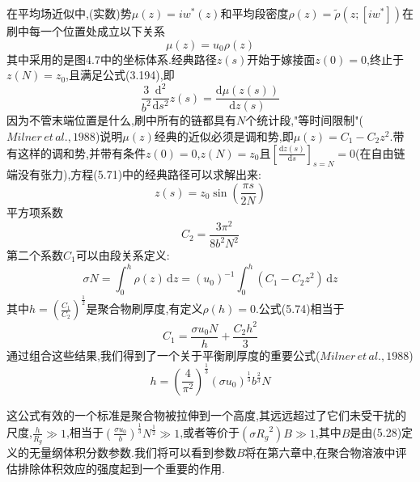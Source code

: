在平均场近似中,(实数)势$\mu(z) = iw^*(z)$和平均段密度$\rho(z) = \tilde{\rho}(z;[iw^*])$在刷中每一个位置处成立以下关系
\begin{equation}
\mu(z) = u_0\rho(z)
\end{equation}
其中采用的是图4.7中的坐标体系.经典路径$z(s)$开始于嫁接面$z(0)=0$,终止于$z(N)=z_0$,且满足公式(3.194),即
\begin{equation}
\frac{3}{b^2}\frac{\mathrm{d}^2}{\mathrm{d} s^2}z(s) = \frac{\mathrm{d}\mu(z(s))}{\mathrm{d}z(s)}
\end{equation}
因为不管末端位置是什么,刷中所有的链都具有$N$个统计段,"等时间限制"($Milner\,et\,al.,1988$)说明$\mu(z)$经典的近似必须是调和势,即$\mu(z) = C_1-C_2 z^2$.带有这样的调和势,并带有条件$z(0)=0$,$z(N)=z_0$且$[\frac{\mathrm{d}z(s)}{\mathrm{d}s}]_{s=N} = 0$(在自由链端没有张力),方程(5.71)中的经典路径可以求解出来:
\begin{equation}
z(s) = z_0 \sin(\frac{\pi s}{2N})
\end{equation}
平方项系数
\begin{equation}
C_2 = \frac{3\pi^2}{8b^2N^2}
\end{equation}
第二个系数$C_1$可以由段关系定义:
\begin{equation}
\sigma N = \int_{0}^{h}\rho(z)\,\mathrm{d}z = (u_0)^{-1}\int_{0}^{h}(C_1-C_2 z^2)\,\mathrm{d}z
\end{equation}
其中$h=(\frac{C_1}{C_2})^{\frac{1}{2}}$是聚合物刷厚度,有定义$\rho(h)=0$.公式(5.74)相当于
\begin{equation}
C_1 = \frac{\sigma u_0 N}{h}+\frac{C_2 h^2}{3}
\end{equation}
通过组合这些结果,我们得到了一个关于平衡刷厚度的重要公式($Milner\,et\,al.,1988$)
\begin{equation}
h = (\frac{4}{\pi^2})^{\frac{1}{3}}(\sigma u_0)^{\frac{1}{3}}b^{\frac{2}{3}}N
\end{equation}

这公式有效的一个标准是聚合物被拉伸到一个高度,其远远超过了它们未受干扰的尺度,$\frac{h}{R_g}\gg 1$,相当于$(\frac{\sigma u_0}{b})^{\frac{1}{3}}N^{\frac{1}{2}}\gg 1$,或者等价于$(\sigma {R_g}^2)B\gg 1$,其中$B$是由(5.28)定义的无量纲体积分数参数.我们将可以看到参数$B$将在第六章中,在聚合物溶液中评估排除体积效应的强度起到一个重要的作用.

